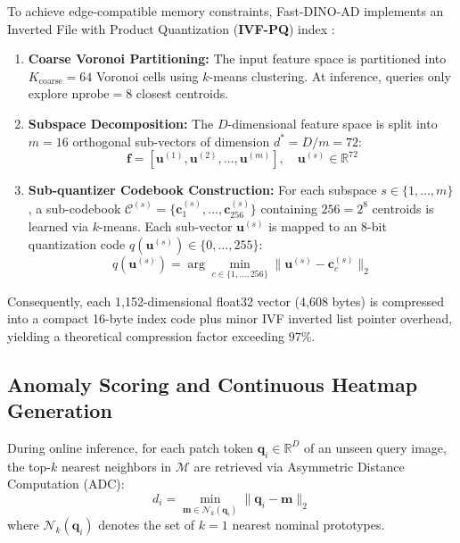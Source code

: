 \documentclass[10pt,journal,compsoc]{IEEEtran}
\begin{document}
To achieve edge-compatible memory constraints, Fast-DINO-AD implements an Inverted File with Product Quantization (\textbf{IVF-PQ}) index \cite{jegou2011product}:
\begin{enumerate}
    \item \textbf{Coarse Voronoi Partitioning:} The input feature space is partitioned into $K_{\text{coarse}} = 64$ Voronoi cells using $k$-means clustering. At inference, queries only explore $\text{nprobe} = 8$ closest centroids.
    \item \textbf{Subspace Decomposition:} The $D$-dimensional feature space is split into $m=16$ orthogonal sub-vectors of dimension $d^* = D/m = 72$:
    \begin{equation}
    \mathbf{f} = [\mathbf{u}^{(1)}, \mathbf{u}^{(2)}, \dots, \mathbf{u}^{(m)}], \quad \mathbf{u}^{(s)} \in \mathbb{R}^{72}
    \end{equation}
    \item \textbf{Sub-quantizer Codebook Construction:} For each subspace $s \in \{1, \dots, m\}$, a sub-codebook $\mathcal{C}^{(s)} = \{\mathbf{c}_1^{(s)}, \dots, \mathbf{c}_{256}^{(s)}\}$ containing $256 = 2^8$ centroids is learned via $k$-means. Each sub-vector $\mathbf{u}^{(s)}$ is mapped to an 8-bit quantization code $q(\mathbf{u}^{(s)}) \in \{0, \dots, 255\}$:
    \begin{equation}
    q(\mathbf{u}^{(s)}) = \arg\min_{c \in \{1,\dots,256\}} \|\mathbf{u}^{(s)} - \mathbf{c}_c^{(s)}\|_2
    \end{equation}
\end{enumerate}

Consequently, each 1,152-dimensional float32 vector (4,608 bytes) is compressed into a compact 16-byte index code plus minor IVF inverted list pointer overhead, yielding a theoretical compression factor exceeding $97\%$.

\subsection{Anomaly Scoring and Continuous Heatmap Generation}
During online inference, for each patch token $\mathbf{q}_i \in \mathbb{R}^D$ of an unseen query image, the top-$k$ nearest neighbors in $\mathcal{M}$ are retrieved via Asymmetric Distance Computation (ADC):
\begin{equation}
d_i = \min_{\mathbf{m} \in \mathcal{N}_k(\mathbf{q}_i)} \|\mathbf{q}_i - \mathbf{m}\|_2
\end{equation}
where $\mathcal{N}_k(\mathbf{q}_i)$ denotes the set of $k=1$ nearest nominal prototypes.
\end{document}
